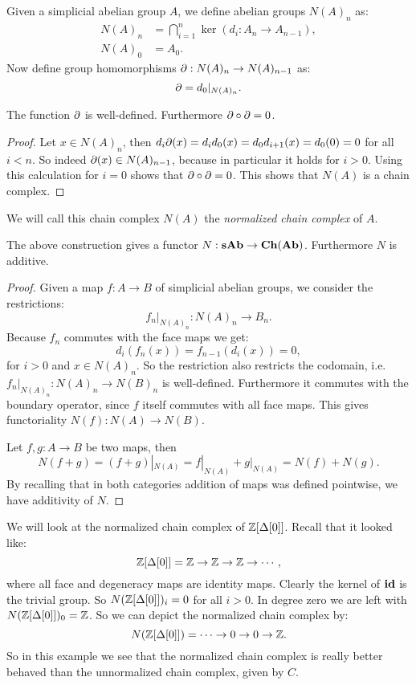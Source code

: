 Given a simplicial abelian group $A$, we define abelian groups $N(A)_n$ as:
\begin{align*}
	N(A)_n &= \bigcap_{i=1}^{n} \ker(d_i : A_n \to A_{n-1}), \\
	N(A)_0 &= A_0.
\end{align*}
Now define group homomorphisms $\partial : N(A)_n \to N(A)_{n-1}$ as:
$$ \partial = d_0|_{N(A)_n}. $$
\begin{lemma}
	The function $ \partial $ is well-defined. Furthermore $ \partial \circ \partial = 0 $.
\end{lemma}
\begin{proof}
	Let $x \in N(A)_n$, then $d_i \partial(x) = d_i d_0(x) = d_0 d_{i+1}(x) = d_0 (0) = 0$ for all $i < n$. So indeed $\partial(x) \in N(A)_{n-1}$, because in particular it holds for $i > 0$. Using this calculation for $i = 0$ shows that $\partial \circ \partial = 0$. This shows that $N(A)$ is a chain complex.
\end{proof}

We will call this chain complex $N(A)$ the \emph{normalized chain complex} of $A$.
\begin{lemma}
	The above construction gives a functor $N: \mathbf{sAb} \to \mathbf{Ch}(\mathbf{Ab})$. Furthermore $N$ is additive.
\end{lemma}
\begin{proof}
	Given a map $f: A \to B$ of simplicial abelian groups, we consider the restrictions:
	$$ f_n |_{N(A)_n} : N(A)_n \to B_n. $$
	Because $f_n$ commutes with the face maps we get:
	$$ d_i(f_n(x)) = f_{n-1}(d_i(x)) = 0, $$
	for $i>0$ and $x \in N(A)_n$. So the restriction also restricts the codomain, i.e. $f_n |_{N(A)_n} : N(A)_n \to N(B)_n$ is well-defined. Furthermore it commutes with the boundary operator, since $f$ itself commutes with all face maps. This gives functoriality $N(f): N(A) \to N(B)$.

	Let $f, g: A \to B$ be two maps, then
	$$ N(f+g) = (f+g)|_{N(A)} = f|_{N(A)} + g|_{N(A)} = N(f) + N(g). $$
	By recalling that in both categories addition of maps was defined pointwise, we have additivity of $N$.
\end{proof}

\begin{example}
	We will look at the normalized chain complex of $\mathbb{Z}[\Delta[0]]$. Recall that it looked like:
	$$ \mathbb{Z}[\Delta[0]] = \mathbb{Z} \to \mathbb{Z} \to \mathbb{Z} \to \cdots, $$
	where all face and degeneracy maps are identity maps. Clearly the kernel of $\mathbf{id}$ is the trivial group. So $N(\mathbb{Z}[\Delta[0]])_i = 0$ for all $i > 0$. In degree zero we are left with $N(\mathbb{Z}[\Delta[0]])_0 = \mathbb{Z}$. So we can depict the normalized chain complex by:
	$$ N(\mathbb{Z}[\Delta[0]]) = \cdots \to 0 \to 0 \to \mathbb{Z}. $$
	So in this example we see that the normalized chain complex is really better behaved than the unnormalized chain complex, given by $C$.
\end{example}

